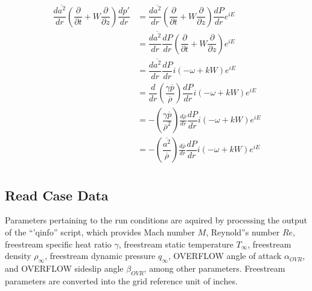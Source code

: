 \documentclass[]{aiaa-tc}%
\begin{document}
\begin{equation}
\begin{split}
\dfrac{d \overline{a^2}}{dr} \left( \dfrac{\partial}{\partial t} + W \dfrac{\partial}{\partial z} \right) \dfrac{dp'}{dr}
&= \dfrac{d \overline{a^2}}{dr}
   \left( \dfrac{\partial}{\partial t} + W \dfrac{\partial}{\partial z} \right)
   \dfrac{dP}{dr} e^{iE}  \\
&= \dfrac{d \overline{a^2}}{dr} \dfrac{dP}{dr}
   \left( \dfrac{\partial}{\partial t} + W \dfrac{\partial}{\partial z} \right) e^{iE} \\
&= \dfrac{d \overline{a^2}}{dr} \dfrac{dP}{dr}
    i(-\omega + kW) e^{iE} \\
&= \dfrac{d}{dr} \left(\dfrac{\gamma \overline{p}}{\overline{\rho}}\right)
    \dfrac{dP}{dr} i(-\omega + kW) e^{iE} \\
&= -\left(\dfrac{\gamma \overline{p}}{\overline{\rho}^2}\right) \frac{d \overline{\rho}}{dr}
    \dfrac{dP}{dr} i(-\omega + kW) e^{iE} \\
&= -\left(\dfrac{\overline{a^2}}{\overline{\rho}}\right) \frac{d \overline{\rho}}{dr}
    \dfrac{dP}{dr} i(-\omega + kW) e^{iE} \\
\end{split}
\end{equation}




















\clearpage

\subsection{Read Case Data}

Parameters pertaining to the run conditions are aquired by processing the output of the ``'qinfo'' script, which provides Mach number $M$, Reynold''s number $Re$, freestream specific heat ratio $\gamma$, freestream static temperature $T_{\infty}$, freestream density $\rho_{\infty}$, freestream dynamic pressure $q_{\infty}$, OVERFLOW angle of attack $\alpha_{OVR}$, and OVERFLOW sideslip angle $\beta_{OVR}$, among other parameters.  Freestream parameters are converted into the grid reference unit of inches.
\end{document}
